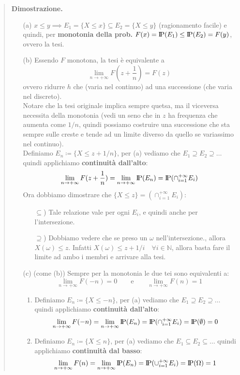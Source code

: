 \documentclass[a4paper,10pt]{article}
\newcommand{\pr}{\text{I\kern-0.15em P}} %
\theoremstyle{remark}
\theoremstyle{definition}
\newenvironment{dimo}{\begin{quote}\textbf{Dimostrazione.}}{\end{quote}} %
\begin{document}
\begin{dimo}
\begin{itemize}
    \item[(a)] $x\le y \implies E_1=\{X\le x\} \subseteq E_2=\{X\le y\}$ (ragionamento facile) e quindi, per \textbf{monotonia della prob.} $F(x)=\pr(E_1)\le \pr(E_2)=F(y)$, ovvero la tesi.
    \item[(b)] Essendo $F$ monotona, la tesi è equivalente a 
    $$\lim_{n\to +\infty}F(z+\frac{1}{n})=F(z)$$
    ovvero ridurre $h$ che (varia nel continuo) ad una successione (che varia nel discreto). \\
    Notare che la tesi originale implica sempre quetsa, ma il viceversa necessita della monotonia (vedi un seno che in $z$ ha frequenza che aumenta come $1/n$, quindi possiamo costruire una successione che sta sempre sulle creste e tende ad un limite diverso da quello se variassimo nel continuo).  \\
    Definiamo $E_n\coloneqq\{X\le z+1/n\}$, per (a) vediamo che $E_1\supseteq E_2\supseteq \dots$ quindi applichiamo \textbf{continuità dall'alto}:
    $$\lim_{n\to +\infty}F(z+\frac{1}{n})=\lim_{n\to+\infty}\pr(E_n)=\pr(\cap_{i=1}^{+\infty}E_i)$$
    Ora dobbiamo dimostrare che $\{X\le z\}=(\cap_{i=1}^{+\infty}E_i)$:
    \begin{itemize}
      \item[$\subseteq$)] Tale relazione vale per ogni $E_i$, e quindi anche per l'intersezione.
        \item[$\supseteq$)] Dobbiamo vedere che se preso un $\omega$ nell'intersezione., allora $X(\omega)\le z$. Infatti $X(\omega)\le z+1/i \quad \forall i\in \mathbb{N}$, allora basta fare il limite ad ambo i membri e arrivare alla tesi. 
    \end{itemize}
    \item[(c)] (come (b)) Sempre per la monotonia le due tei sono equivalenti a:
    $$\lim_{n\to +\infty}F(-n)=0 \quad \quad \text{e} \quad \quad \lim_{n\to +\infty}F(n)=1$$
    \begin{enumerate}
        \item  Definiamo $E_n\coloneqq\{X\le -n\}$, per (a) vediamo che $E_1\supseteq E_2\supseteq \dots$ quindi applichiamo \textbf{continuità dall'alto}:
        $$\lim_{n\to +\infty}F(-n)=\lim_{n\to+\infty}\pr(E_n)=\pr(\cap_{i=1}^{+\infty}E_i)=\pr(\emptyset)=0$$
        \item   Definiamo $E_n\coloneqq\{X\le n\}$, per (a) vediamo che $E_1\subseteq E_2\subseteq \dots$ quindi applichiamo \textbf{continuità dal basso}:
        $$\lim_{n\to +\infty}F(n)=\lim_{n\to+\infty}\pr(E_n)=\pr(\cup_{i=1}^{+\infty}E_i)=\pr(\Omega)=1$$
    \end{enumerate}
\end{itemize}
\end{dimo}
\end{document}
